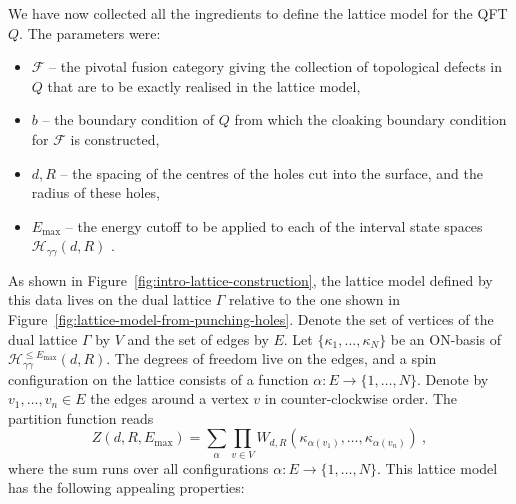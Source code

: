 \documentclass[11pt,a4paper]{article}
\numberwithin{equation}{section}
\begin{document}
We have now collected all the ingredients to define the lattice model for the QFT $Q$. The parameters were:
\begin{itemize}
    \item $\mathcal{F}$ -- the pivotal fusion category giving the collection of topological defects in $Q$ that are to be exactly realised in the lattice model,
    \item $b$ -- the boundary condition of $Q$ from which the cloaking boundary condition for $\mathcal{F}$ is constructed,
    \item $d,R$ -- the spacing of the centres of the holes cut into the surface, and the radius of these holes,
    \item $E_\mathrm{max}$ -- the energy cutoff to be applied to each of the interval state spaces $\mathcal{H}_{\gamma\gamma}(d,R)$ .
\end{itemize}
As shown in Figure~\ref{fig:intro-lattice-construction},
the lattice model defined by this data lives on the dual lattice $\Gamma$ relative to the one shown in Figure~\ref{fig:lattice-model-from-punching-holes}. Denote the set of vertices of the dual lattice $\Gamma$ by $V$ and the set of edges by $E$. Let $\{\kappa_1,\dots,\kappa_N\}$ be an ON-basis of $\mathcal{H}_{\gamma\gamma}^{\le E_{\mathrm{max}}}(d,R)$. 
The degrees of freedom live on the edges, and a spin configuration on the lattice consists of a function $\alpha : E \to \{1,\dots,N\}$. Denote by $v_1,\dots,v_n \in E$ the edges around a vertex $v$ in counter-clockwise order. The partition function reads
\begin{equation}
    Z(d,R,E_\mathrm{max}) = \sum_\alpha \prod_{v \in V} W_{d,R}(\kappa_{\alpha(v_1)}, \dots , \kappa_{\alpha(v_n)}) ~,
\end{equation}
where the sum runs over all configurations $\alpha : E \to \{1,\dots,N\}$. This lattice model has the following appealing properties:
\end{document}
